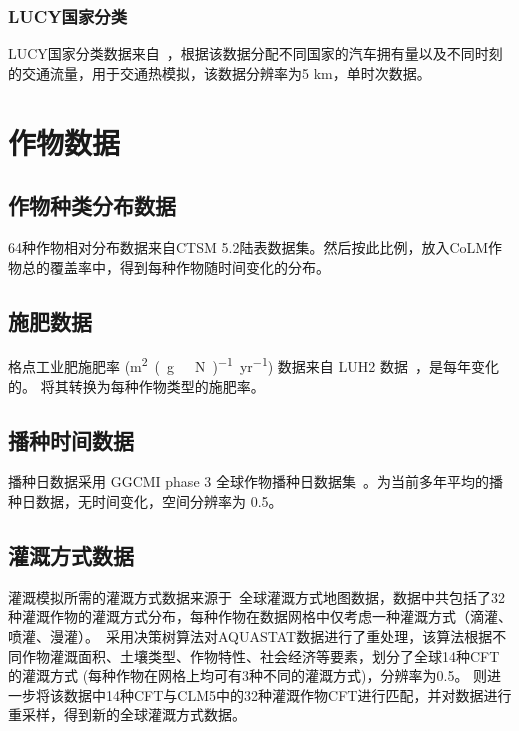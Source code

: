 \subsubsection{LUCY国家分类}\label{LUCY国家分类}
LUCY国家分类数据来自~\citet{allen2011}，根据该数据分配不同国家的汽车拥有量以及不同时刻的交通流量，用于交通热模拟，该数据分辨率为5 km，单时次数据。


\section{作物数据}

\subsection{作物种类分布数据}\label{作物种类分布数据}
64种作物相对分布数据来自CTSM 5.2陆表数据集。然后按此比例，放入CoLM作物总的覆盖率中，得到每种作物随时间变化的分布。

\subsection{施肥数据}\label{施肥数据}
格点工业肥施肥率 (\unit{m^2.(g\ N)^{-1}.yr^{-1}}) 数据来自 LUH2 数据~\citep{hurtt2011harmonization}，是每年变化的。\citet{lawrence2016land} 将其转换为每种作物类型的施肥率。

\subsection{播种时间数据}\label{播种时间数据}
播种日数据采用 GGCMI phase 3 全球作物播种日数据集~\citep{jagermeyr2021climate}。为当前多年平均的播种日数据，无时间变化，空间分辨率为 0.5\textdegree。

\subsection{灌溉方式数据}\label{灌溉方式数据}
灌溉模拟所需的灌溉方式数据来源于~\citet{yao2022Irrigation}全球灌溉方式地图数据，数据中共包括了32种灌溉作物的灌溉方式分布，每种作物在数据网格中仅考虑一种灌溉方式（滴灌、喷灌、漫灌）。~\citet{jagermeyr2015irrigation}采用决策树算法对AQUASTAT数据\citep{fao2014aquastat}进行了重处理，该算法根据不同作物灌溉面积、土壤类型、作物特性、社会经济等要素，划分了全球14种CFT的灌溉方式 (每种作物在网格上均可有3种不同的灌溉方式)，分辨率为0.5\textdegree。\citet{yao2022Irrigation} 则进一步将该数据中14种CFT与CLM5中的32种灌溉作物CFT进行匹配，并对数据进行重采样，得到新的全球灌溉方式数据。




